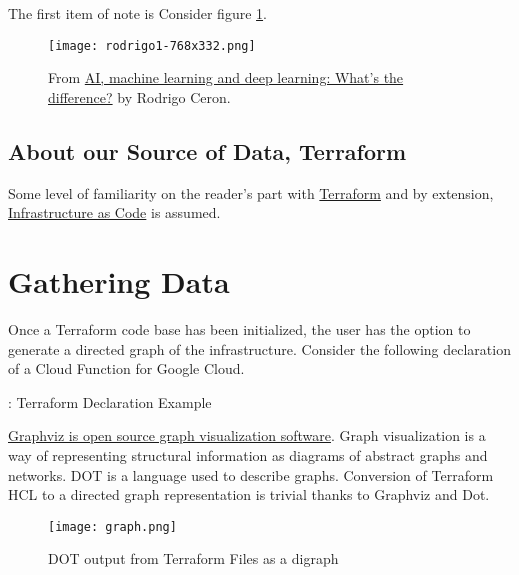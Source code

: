 \justifying
The first item of note is Consider figure \ref{aimldl}.
\vspace{2mm}

\begin{figure}[H]
	\texttt{[image: rodrigo1-768x332.png]}
	\caption{From \href{https://www.ibm.com/blogs/systems/ai-machine-learning-and-deep-learning-whats-the-difference/}{AI, machine learning and deep learning: What’s the difference?} by Rodrigo Ceron.}
	\label{aimldl}
\end{figure}

\subsection{\label{sec:terraform}About our Source of Data, Terraform}

\justifying
Some level of familiarity on the reader's part with \href{https://www.terraform.io/intro/index.html}{Terraform} and
by extension, \href{https://learn.hashicorp.com/tutorials/terraform/infrastructure-as-code}{Infrastructure as Code} is
assumed. 
\vspace{2mm}

\section{\label{sec:collection}Gathering Data}

\justifying
Once a Terraform code base has been initialized, the user has the option to generate a directed graph of the infrastructure. Consider the following declaration of a Cloud Function for Google Cloud.

\begin{mybox}{\thetcbcounter: Terraform Declaration Example}
    
\end{mybox}

\justifying
\href{https://graphviz.org/}{Graphviz is open source graph visualization software}. Graph visualization is a way of representing
structural information as diagrams of abstract graphs and networks. DOT is a language used to describe graphs. Conversion of
Terraform HCL to a directed graph representation is trivial thanks to Graphviz and Dot.

\justifying
\begin{figure}[H]
	\texttt{[image: graph.png]}
	\caption{DOT output from Terraform Files as a digraph}
	\label{pygraph}
\end{figure}

